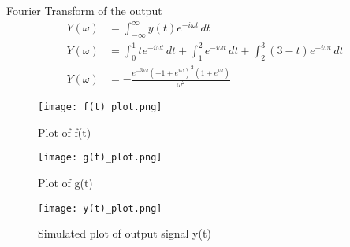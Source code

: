 \documentclass[journal,12pt,twocolumn]{IEEEtran}
\begin{document}
Fourier Transform of the output
\begin{align}
    Y(\omega) &= \int_{-\infty}^{\infty}y(t)e^{-i\omega t}\,dt\\
    Y(\omega) &= \int_0^1 te^{-i\omega t}\,dt + \int_1^2e^{-i\omega t}\,dt + \int_2^3(3-t)e^{-i\omega t}\,dt\\
    Y(\omega) &= -\frac{e^{-3i\omega} (-1 + e^{i\omega})^2 (1 + e^{i\omega})}{\omega^2}
\end{align}
\begin{figure}[!ht]
    \centering
    \texttt{[image: f(t)\_plot.png]}
    \caption{Plot of f(t)}
    \label{plot}
\end{figure}
\begin{figure}[!ht]
    \centering
    \texttt{[image: g(t)\_plot.png]}
    \caption{Plot of g(t)}
    \label{plot}
\end{figure}
\begin{figure}[!ht]
    \centering
    \texttt{[image: y(t)\_plot.png]}
    \caption{Simulated plot of output signal y(t)}
    \label{plot}
\end{figure}
\end{document}

